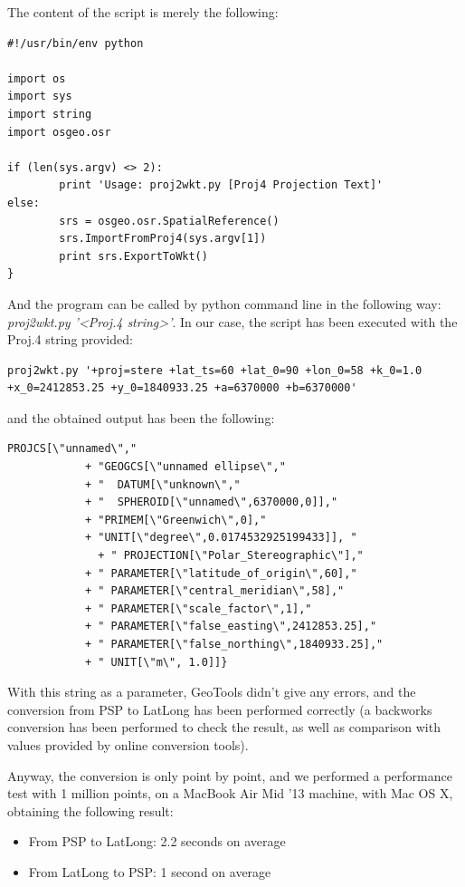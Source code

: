 \documentclass[11pt,a4paper,titlepage,oneside]{report}
\begin{document}
The content of the script is merely the following:

\begin{lstlisting}
#!/usr/bin/env python

import os
import sys
import string
import osgeo.osr

if (len(sys.argv) <> 2):
        print 'Usage: proj2wkt.py [Proj4 Projection Text]'
else:
        srs = osgeo.osr.SpatialReference()
        srs.ImportFromProj4(sys.argv[1])
        print srs.ExportToWkt()
}
\end{lstlisting}

And the program can be called by python command line in the following way:
\textit{proj2wkt.py '<Proj.4 string>'}. In our case, the script has been executed with the Proj.4 string provided:
\begin{lstlisting}
proj2wkt.py '+proj=stere +lat_ts=60 +lat_0=90 +lon_0=58 +k_0=1.0 +x_0=2412853.25 +y_0=1840933.25 +a=6370000 +b=6370000'
\end{lstlisting}

and the obtained output has been the following:
\begin{lstlisting}
PROJCS[\"unnamed\","
            + "GEOGCS[\"unnamed ellipse\","
            + "  DATUM[\"unknown\","
            + "  SPHEROID[\"unnamed\",6370000,0]],"
            + "PRIMEM[\"Greenwich\",0],"
            + "UNIT[\"degree\",0.0174532925199433]], "
              + " PROJECTION[\"Polar_Stereographic\"],"
            + " PARAMETER[\"latitude_of_origin\",60],"
            + " PARAMETER[\"central_meridian\",58],"
            + " PARAMETER[\"scale_factor\",1],"
            + " PARAMETER[\"false_easting\",2412853.25],"
            + " PARAMETER[\"false_northing\",1840933.25],"
            + " UNIT[\"m\", 1.0]]}
\end{lstlisting}

With this string as a parameter, GeoTools didn't give any errors, and the conversion from PSP to LatLong has been performed correctly (a backworks conversion has been performed to check the result, as well as comparison with values provided by online conversion tools).

Anyway, the conversion is only point by point, and we performed a performance test with 1 million points, on a MacBook Air Mid '13 machine, with Mac OS X, obtaining the following result:
\begin{itemize}
\item From PSP to LatLong: 2.2 seconds on average
\item From LatLong to PSP: 1 second on average
\end{itemize}
\end{document}
